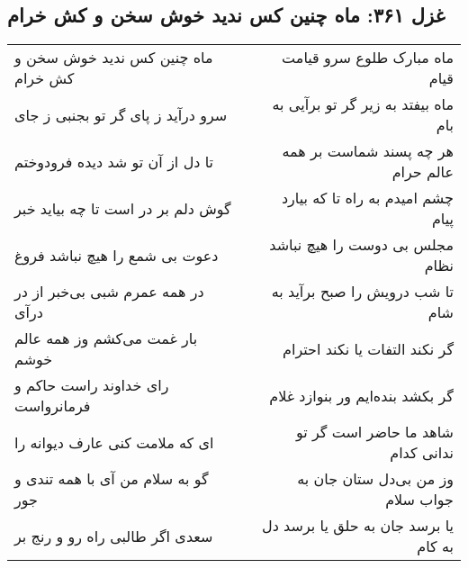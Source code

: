 \begin{center}
\section*{غزل ۳۶۱: ماه چنین کس ندید خوش سخن و کش خرام}
\label{sec:361}
\begin{longtable}{l p{0.5cm} r}
ماه چنین کس ندید خوش سخن و کش خرام
&&
ماه مبارک طلوع سرو قیامت قیام
\\
سرو درآید ز پای گر تو بجنبی ز جای
&&
ماه بیفتد به زیر گر تو برآیی به بام
\\
تا دل از آن تو شد دیده فرودوختم
&&
هر چه پسند شماست بر همه عالم حرام
\\
گوش دلم بر در است تا چه بیاید خبر
&&
چشم امیدم به راه تا که بیارد پیام
\\
دعوت بی شمع را هیچ نباشد فروغ
&&
مجلس بی دوست را هیچ نباشد نظام
\\
در همه عمرم شبی بی‌خبر از در درآی
&&
تا شب درویش را صبح برآید به شام
\\
بار غمت می‌کشم وز همه عالم خوشم
&&
گر نکند التفات یا نکند احترام
\\
رای خداوند راست حاکم و فرمانرواست
&&
گر بکشد بنده‌ایم ور بنوازد غلام
\\
ای که ملامت کنی عارف دیوانه را
&&
شاهد ما حاضر است گر تو ندانی کدام
\\
گو به سلام من آی با همه تندی و جور
&&
وز من بی‌دل ستان جان به جواب سلام
\\
سعدی اگر طالبی راه رو و رنج بر
&&
یا برسد جان به حلق یا برسد دل به کام
\\
\end{longtable}
\end{center}
